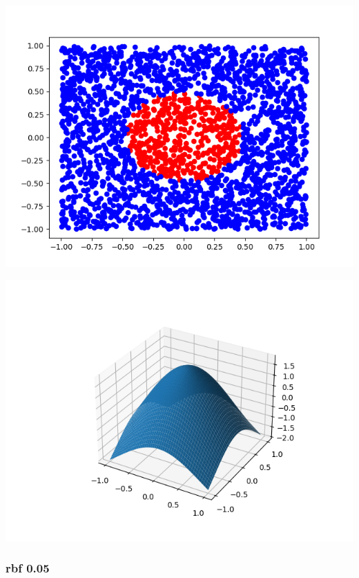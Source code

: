 \documentclass[11pt]{article}
\begin{document}
\begin{center}
\includegraphics[scale=0.7]{./res/ac_points_rbf_0.25.png}
\end{center}

\begin{center}
\includegraphics[scale=0.7]{./res/ac_surface_rbf_0.25.png}
\end{center}

\subsubsection*{rbf 0.05}
\label{sec:org2046337}
\end{document}
